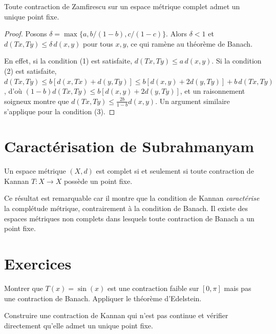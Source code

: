 \begin{theoreme}[Zamfirescu, 1972]
Toute contraction de Zamfirescu sur un espace m\'etrique complet admet un unique
point fixe.
\end{theoreme}

\begin{proof}
Posons $\delta = \max\{a, b/(1-b), c/(1-c)\}$. Alors $\delta < 1$ et
$d(Tx, Ty) \leq \delta \, d(x,y)$ pour tous $x, y$, ce qui ram\`ene au
th\'eor\`eme de Banach.

En effet, si la condition (1) est satisfaite, $d(Tx,Ty) \leq a \, d(x,y)$.
Si la condition (2) est satisfaite, $d(Tx,Ty) \leq b[d(x,Tx) + d(y,Ty)]
\leq b[d(x,y) + 2d(y, Ty)] + b \, d(Tx, Ty)$, d'o\`u $(1-b) d(Tx,Ty) \leq
b[d(x,y) + 2d(y,Ty)]$, et un raisonnement soigneux montre que
$d(Tx,Ty) \leq \frac{2b}{1-b} d(x,y)$.
Un argument similaire s'applique pour la condition (3).
\end{proof}

\section{Caract\'erisation de Subrahmanyam}

\begin{theoreme}[Subrahmanyam, 1975]
Un espace m\'etrique $(X, d)$ est complet si et seulement si toute contraction de
Kannan $T : X \to X$ poss\`ede un point fixe.
\end{theoreme}

\begin{remarque}
Ce r\'esultat est remarquable car il montre que la condition de Kannan
\emph{caract\'erise} la compl\'etude m\'etrique, contrairement \`a la condition de
Banach. Il existe des espaces m\'etriques non complets dans lesquels toute
contraction de Banach a un point fixe.
\end{remarque}

\section{Exercices}

\begin{exercice}
Montrer que $T(x) = \sin(x)$ est une contraction faible sur $[0, \pi]$ mais
pas une contraction de Banach. Appliquer le th\'eor\`eme d'Edelstein.
\end{exercice}

\begin{exercice}
Construire une contraction de Kannan qui n'est pas continue et v\'erifier
directement qu'elle admet un unique point fixe.
\end{exercice}

